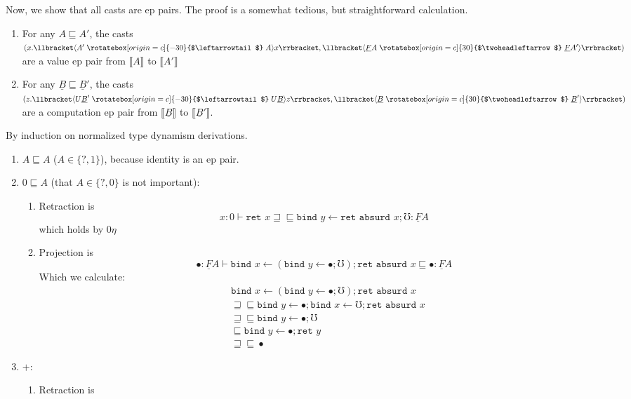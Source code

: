 \documentclass[acmsmall,nonacm]{acmart}
\renewcommand{\u}{\underline}
\newcommand{\sem}[1]{\llbracket#1\rrbracket}
\newcommand{\ltdyn}{\sqsubseteq}
\newcommand{\gtdyn}{\sqsupseteq}
\newcommand{\equidyn}{\mathrel{\gtdyn\ltdyn}}
\newcommand{\dyn}{{?}}
\newcommand{\uarrow}{\mathrel{\rotatebox[origin=c]{-30}{$\leftarrowtail$}}}
\newcommand{\darrow}{\mathrel{\rotatebox[origin=c]{30}{$\twoheadleftarrow$}}}
\newcommand{\upcast}[2]{\langle{#2}\uarrow{#1}\rangle}
\newcommand{\dncast}[2]{\langle{#1}\darrow{#2}\rangle}
\newcommand{\err}{\mho}
\newcommand{\bindXtoYinZ}[2]{\kw{bind}#2 \leftarrow #1;}
\newcommand{\kw}[1]{\texttt{#1}\,\,}
\newcommand{\absurd}{\kw{absurd}}
\newcommand{\ret}{\kw{ret}}
\begin{document}
\begin{longonly}
Now, we show that all casts are ep pairs.
%
The proof is a somewhat tedious, but straightforward calculation.

\begin{lemma}\hfill
  \label{lem:casts-are-ep-pairs}
  \begin{enumerate}
  \item For any $A \ltdyn A'$, the casts $(x.\sem{\upcast{A}{A'}x},
    \sem{\dncast{\u F A}{\u F A'}})$ are a value ep pair from
    $\sem{A}$ to $\sem{A'}$
  \item For any $\u B \ltdyn \u B'$, the casts $(z. \sem{\upcast{U \u
      B}{U \u B'}z}, \sem{\dncast{\u B}{\u B'}})$ are a computation ep
    pair from $\sem{\u B}$ to $\sem{\u B'}$.
  \end{enumerate}
\end{lemma}
\begin{longproof}
  By induction on normalized type dynamism derivations.
  \begin{enumerate}
  \item $A \ltdyn A$ ($A \in \{\dyn, 1\}$), because identity is an ep pair.
  \item $0 \ltdyn A$ (that $A \in \{ \dyn, 0 \}$ is not important):
    \begin{enumerate}
    \item Retraction is
      \[ x : 0 \vdash \ret x \equidyn \bindXtoYinZ {\ret\absurd x} y \err : \u F A \]
      which holds by $0\eta$
    \item Projection is
      \[ \bullet : \u F A \vdash \bindXtoYinZ {(\bindXtoYinZ \bullet y \err)} x {\ret\absurd x} \ltdyn \bullet : \u F A \]
      Which we calculate:
      \begin{align*}
        &\bindXtoYinZ {(\bindXtoYinZ \bullet y \err)} x {\ret\absurd x}\\
        &\equidyn \bindXtoYinZ \bullet y \bindXtoYinZ \err x {\ret\absurd x}\tag{comm conv}\\
        &\equidyn \bindXtoYinZ \bullet y \err \tag{Strictness of Stacks}\\
        &\ltdyn \bindXtoYinZ \bullet y \ret y \tag{$\err$ is $\bot$}\\
        &\equidyn \bullet \tag{$\u F\eta$}
      \end{align*}
    \end{enumerate}
  \item $+$:
    \begin{enumerate}
    \item Retraction is
      \begin{align*}

\end{align*}
\end{enumerate}
\end{enumerate}
\end{longproof}
\end{longonly}
\end{document}

